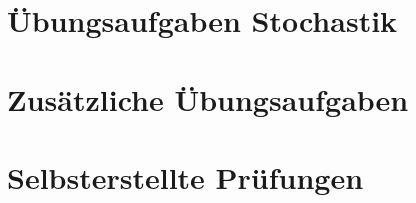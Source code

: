 \documentclass[11pt, oneside]{report}
\begin{document}
	\part{Übungsaufgaben Stochastik}
	
	
	
	
	
	
	

	\part{Zusätzliche Übungsaufgaben}
	

	\part{Selbsterstellte Prüfungen}
	
\end{document}

